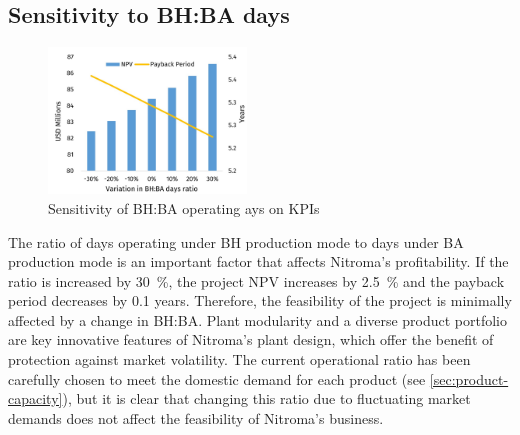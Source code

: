 \subsection{Sensitivity to BH:BA days}
\label{sec:sensitivity-ratiodays}
\begin{figure}
    \vspace{-1.1cm}
    \caption{Sensitivity of BH:BA operating ays on KPIs}
    \label{Sensitivity_BHBA}
    \includegraphics[width=0.47\textwidth]{chapters/6-economics/figures/Sensitivity_OperatingDays.jpg}
\end{figure}
The ratio of days operating under BH production mode to days under BA production mode is an important factor that affects Nitroma’s profitability. If the ratio is increased by \SI{30}{\percent}, the project NPV increases by \SI{2.5}{\percent} and the payback period decreases by 0.1 years. Therefore, the feasibility of the project is minimally affected by a change in BH:BA. Plant modularity and a diverse product portfolio are key innovative features of Nitroma’s plant design, which offer the benefit of protection against market volatility. The current operational ratio has been carefully chosen to meet the domestic demand for each product (see \cref{sec:product-capacity}), but it is clear that changing this ratio due to fluctuating market demands does not affect the feasibility of Nitroma’s business.